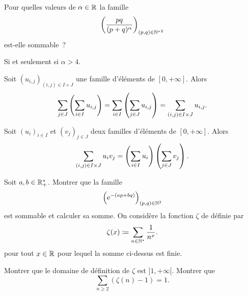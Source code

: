 \documentclass{magnolia}
\begin{document}
\begin{exoUnique}
\exo Pour quelles valeurs de $\alpha\in\mathbb{R}$ la famille
  \[\left(\frac{pq}{(p+q)^{\alpha}}\right)_{(p,q)\in{\mathbb{N}^*}^2}\]
  est-elle sommable~?
\begin{sol}
Si et seulement si $\alpha>4$. 
\end{sol}
\end{exoUnique}

\begin{proposition}[nom={Théorème de \nom{Fubini}}]
Soit $(u_{i,j})_{(i,j)\in I\times J}$ une famille d'éléments de $[0,+\infty]$. Alors
\[\sum_{j\in J} \left(\sum_{i\in I} u_{i,j}\right)=
  \sum_{i\in I} \left(\sum_{j\in J} u_{i,j}\right)=
  \sum_{(i,j)\in I\times J} u_{i,j}.\]
\end{proposition}


\begin{proposition}
Soit $(u_i)_{i\in I}$ et $(v_j)_{j\in J}$ deux familles d'éléments de $[0,+\infty]$.
Alors
\[\sum_{(i,j)\in I\times J} u_i v_j = \left(\sum_{i\in I} u_i\right) \left(\sum_{j\in J} v_j\right).\]
\end{proposition}


\begin{exos}
\exo Soit $a,b\in\mathbb{R}_+^*$. Montrer que la famille
  \[\left({\rm e}^{-(ap+bq)}\right)_{(p,q)\in\mathbb{N}^2}\]
  est sommable et calculer sa somme.
\exo On considère la fonction $\zeta$ de  définie par
  \[\zeta(x)\coloneqq\sum_{n\in{\mathbb{N}^*}} \frac{1}{n^x}.\]
  pour tout $x\in\mathbb{R}$ pour lequel la somme ci-dessus est finie.
  \begin{questions}
  \question Montrer que le domaine de définition de $\zeta$ est $]1,+\infty[$.
  \question Montrer que
    \[\sum_{n\geq 2} (\zeta(n)-1)=1.\] 
  \end{questions}
\end{exos}

\end{document}
